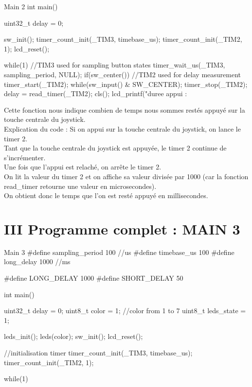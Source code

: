 {\begin{Cpp}{Main 2}
int main()
{
    uint32_t delay = 0;
    
    sw_init();
    timer_count_init(_TIM3, timebase_us);
    timer_count_init(_TIM2, 1);
    lcd_reset();    
    
    while(1)
    {
        //TIM3 used for sampling button states
        timer_wait_us(_TIM3, sampling_period, NULL);
        if(sw_center())
        {
            //TIM2 used for delay measurement
            timer_start(_TIM2);
            while(sw_input() & SW_CENTER);
            timer_stop(_TIM2);
            delay = read_timer(_TIM2);
            cls();
            lcd_printf("duree appui : %
        }
    }        
}
\end{Cpp}

Cette fonction nous indique combien de temps nous sommes restés appuyé sur la touche centrale du joystick.\\
Explication du code :
Si on appui sur la touche centrale du joystick, on lance le timer 2.\\
Tant que la touche centrale du joystick est appuyée, le timer 2 continue de s'incrémenter.\\
Une fois que l'appui est relaché, on arrête le timer 2.\\
On lit la valeur du timer 2 et on affiche sa valeur divisée par 1000 (car la fonction read\_timer retourne une valeur en microsecondes).\\ On obtient donc le temps que l'on est resté appuyé en millisecondes. 



\newpage
\section{III Programme complet : MAIN 3}
\begin{Cpp}{Main 3} 
#define sampling_period 100         //us
#define timebase_us     100
#define long_delay      1000        //ms

#define LONG_DELAY 1000
#define SHORT_DELAY 50


int main()
{
    uint32_t delay = 0;
    uint8_t color = 1;  //color from 1 to 7
    uint8_t leds_state = 1;

    
    leds_init();
    leds(color);
    sw_init();
    lcd_reset();
    
    //initialisation timer
    timer_count_init(_TIM3, timebase_us);
    timer_count_init(_TIM2, 1);
    
    while(1)
    {

}}
\end{Cpp}}
